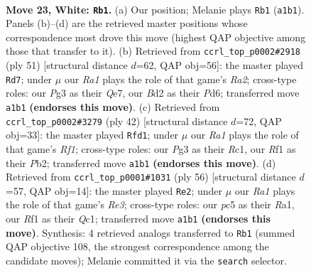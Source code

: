\documentclass[11pt]{article}
\begin{document}
\clearpage

\begin{figure}[p]\centering
\begin{subfigure}{0.46\textwidth}\centering
\resizebox{\linewidth}{!}{%
\newchessgame
\chessboard[
  setfen={r1bq1rk1/5p2/6p1/2p1p2p/4P2P/p1P3P1/P2B1P2/R3QRK1 w - - 1 23},
  showmover=false,
  pgfstyle=straightmove, color=movearrow, markmove={a1-b1}
]}
\caption{}
\end{subfigure}\hfill
\begin{subfigure}{0.46\textwidth}\centering
\resizebox{\linewidth}{!}{%
\newchessgame
\chessboard[
  setfen={4r1k1/r3qpp1/p2p3p/P1pP4/1pP2Q2/3P3P/1P4P1/3R1RK1 b - - 0 26},
  showmover=false,
  pgfstyle=straightmove, color=movearrow, markmove={a7-d7}
]}
\caption{}
\end{subfigure}
\\[4pt]
\begin{subfigure}{0.46\textwidth}\centering
\resizebox{\linewidth}{!}{%
\newchessgame
\chessboard[
  setfen={r2q2k1/5rp1/p2b3p/1p1P1p2/4pP2/1Q2B1P1/PP4KP/2R2R2 w - - 1 22},
  showmover=false,
  pgfstyle=straightmove, color=movearrow, markmove={f1-d1}
]}
\caption{}
\end{subfigure}\hfill
\begin{subfigure}{0.46\textwidth}\centering
\resizebox{\linewidth}{!}{%
\newchessgame
\chessboard[
  setfen={rr4k1/4pp1p/b5p1/1q1Pp2P/2p1P3/4RBP1/P4P2/R1Q3K1 w - - 1 29},
  showmover=false,
  pgfstyle=straightmove, color=movearrow, markmove={e3-e2}
]}
\caption{}
\end{subfigure}
\caption{\textbf{Move 23, White: \texttt{Rb1}.} (a) Our position; Melanie plays \texttt{Rb1} (\texttt{a1b1}). Panels (b)--(d) are the retrieved master positions whose correspondence most drove this move (highest QAP objective among those that transfer to it). (b) Retrieved from \texttt{ccrl\_top\_p0002\#2918} (ply 51) [structural distance $d$=62, QAP obj=56]: the master played \texttt{Rd7}; under $\mu$ our \emph{Ra1} plays the role of that game's \emph{Ra2}; cross-type roles: our \emph{P}g3 as their \emph{Q}e7, our \emph{B}d2 as their \emph{P}d6; transferred move \texttt{a1b1} \textbf{(endorses this move)}. (c) Retrieved from \texttt{ccrl\_top\_p0002\#3279} (ply 42) [structural distance $d$=72, QAP obj=33]: the master played \texttt{Rfd1}; under $\mu$ our \emph{Ra1} plays the role of that game's \emph{Rf1}; cross-type roles: our \emph{P}g3 as their \emph{R}c1, our \emph{R}f1 as their \emph{P}b2; transferred move \texttt{a1b1} \textbf{(endorses this move)}. (d) Retrieved from \texttt{ccrl\_top\_p0001\#1031} (ply 56) [structural distance $d$=57, QAP obj=14]: the master played \texttt{Re2}; under $\mu$ our \emph{Ra1} plays the role of that game's \emph{Re3}; cross-type roles: our \emph{p}c5 as their \emph{R}a1, our \emph{R}f1 as their \emph{Q}c1; transferred move \texttt{a1b1} \textbf{(endorses this move)}. Synthesis: 4 retrieved analogs transferred to \texttt{Rb1} (summed QAP objective 108, the strongest correspondence among the candidate moves); Melanie committed it via the \texttt{search} selector.}
\label{fig:thought-m44}
\end{figure}
\end{document}
